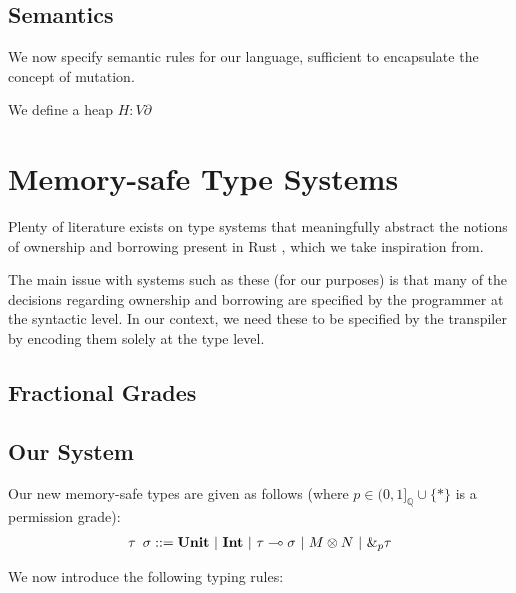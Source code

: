 \documentclass{article}
\renewcommand\em{\bfseries}
\begin{document}
\subsection{Semantics}

We now specify semantic rules for our language, sufficient to encapsulate the concept of mutation.

We define a heap $H : V \partial $

\section{Memory-safe Type Systems}

Plenty of literature exists on type systems that meaningfully abstract the notions of ownership and borrowing present in Rust \cite{marshall2022entente, marshall2024fracunique}, which we take inspiration from. 


The main issue with systems such as these (for our purposes) is that many of the decisions regarding ownership and borrowing are specified by the programmer at the syntactic level. In our context, we need these to be specified by the transpiler by encoding them solely at the type level. 



\subsection{Fractional Grades}

\subsection{Our System}

Our new memory-safe types are given as follows (where $p \in (0, 1]_{\mathbb{Q}} \cup \{*\}$ is a permission grade):
\begin{align*}
    \tau \hspace{0.5em} \sigma ::= \textbf{Unit} ~|~ \textbf{Int} ~|~ \tau \multimap \sigma ~|~ M \otimes N ~|~ \&_p \tau
\end{align*}

We now introduce the following typing rules:


\renewcommand\em{\it}
\printbibliography[title={References}]
\end{document}
